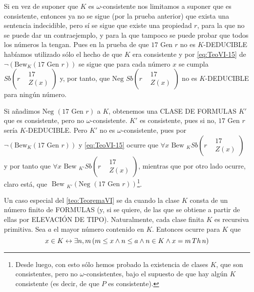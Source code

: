 Si en vez de suponer que $K$ es $\omega$-consistente nos limitamos a suponer que es consistente, entonces ya no se sigue (por la prueba anterior) que exista 
una sentencia indecidible, pero sí se sigue que existe una propiedad $r$, para la que no se puede dar un contraejemplo, y para la que tampoco se puede probar que
todos los números la tengan. Pues en la prueba de que $17 \text{ Gen } r$ no es $K$-DEDUCIBLE habíamos utilizado sólo el hecho de que $K$ era consistente y por
\eqref{eq:TeoVI-15} de $\lnot (\text{Bew}_K (17 \text{ Gen } r))$ se sigue que para cada número $x$ se cumpla $Sb\left(r
\begin{aligned}
    &17 \\
    &Z(x)
\end{aligned}
\right)$
y, por tanto, que $\text{Neg } Sb\left(r
\begin{aligned}
    &17 \\
    &Z(x)
\end{aligned}
\right)$ no es $K$-DEDUCIBLE para ningún número.

Si añadimos $\text{Neg } (17 \text{ Gen } r)$ a $K$, obtenemos una CLASE DE FORMULAS $K'$ que es consistente, pero no $\omega$-consistente. $K'$ es consistente, 
pues si no, $17 \text{ Gen } r$ sería $K$-DEDUCIBLE. Pero $K'$ no es $\omega$-consistente, pues por $\lnot (\text{Bew}_K (17 \text{ Gen } r))$ y \eqref{eq:TeoVI-15}
ocurre que $\forall x \text{ Bew }_K Sb\left(r
\begin{aligned}
    &17 \\
    &Z(x)
\end{aligned}
\right)$ y por tanto que $\forall x \text{ Bew }_{K'} Sb\left(r
\begin{aligned}
    &17 \\
    &Z(x)
\end{aligned}
\right)$, mientras que por otro lado ocurre, claro está, que $\text{ Bew }_{K'} (\text{Neg } (17 \text{ Gen } r))$\footnote{Desde luego, con esto sólo hemos probado 
la existencia de clases $K$, que son consistentes, pero no $\omega$-consistentes, bajo el supuesto de que hay algún $K$ consistente (es decir, de que $P$ es 
consistente).}.

Un caso especial del \autoref{teo:TeoremaVI} se da cuando la clase $K$ consta de un número finito de FORMULAS (y, si se quiere, de las que se obtiene a partir 
de ellas por ELEVACIÓN DE TIPO). Naturalmente, cada clase finita $K$ es recursiva primitiva. Sea $a$ el mayor número contenido en $K$. Entonces ocurre para $K$ que
\begin{equation}
    x \in K \leftrightarrow \exists n,m \thinspace (m \leq x \wedge n \leq a \wedge n \in K \wedge x = m \thinspace Th \thinspace n)
\end{equation}

